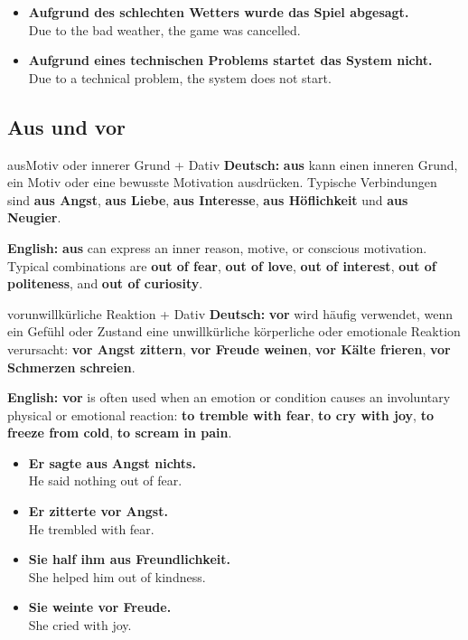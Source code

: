 \documentclass[a4paper,11pt]{article}
\newcommand{\GermanText}[1]{\textbf{Deutsch: }#1\par}
\newcommand{\EnglishText}[1]{{\small\color{SoftGray}\textbf{English: }#1\par}}
\newcommand{\ExampleItem}[2]{\item \textbf{#1}\\{\small\color{SoftGray}#2}}
\begin{document}
            \begin{exbox}
                \begin{itemize}
                    \ExampleItem{Aufgrund des schlechten Wetters wurde das Spiel abgesagt.}{Due to the bad weather, the game was cancelled.}
                    \ExampleItem{Aufgrund eines technischen Problems startet das System nicht.}{Due to a technical problem, the system does not start.}
                \end{itemize}
            \end{exbox}

        \subsection{Aus und vor}

            \begin{grammarentry}{aus}{Motiv oder innerer Grund + Dativ}
                \GermanText{\textbf{aus} kann einen inneren Grund, ein Motiv oder eine bewusste Motivation ausdrücken. Typische Verbindungen sind \textbf{aus Angst}, \textbf{aus Liebe}, \textbf{aus Interesse}, \textbf{aus Höflichkeit} und \textbf{aus Neugier}.}
                \EnglishText{\textbf{aus} can express an inner reason, motive, or conscious motivation. Typical combinations are \textbf{out of fear}, \textbf{out of love}, \textbf{out of interest}, \textbf{out of politeness}, and \textbf{out of curiosity}.}
            \end{grammarentry}

            \begin{grammarentry}{vor}{unwillkürliche Reaktion + Dativ}
                \GermanText{\textbf{vor} wird häufig verwendet, wenn ein Gefühl oder Zustand eine unwillkürliche körperliche oder emotionale Reaktion verursacht: \textbf{vor Angst zittern}, \textbf{vor Freude weinen}, \textbf{vor Kälte frieren}, \textbf{vor Schmerzen schreien}.}
                \EnglishText{\textbf{vor} is often used when an emotion or condition causes an involuntary physical or emotional reaction: \textbf{to tremble with fear}, \textbf{to cry with joy}, \textbf{to freeze from cold}, \textbf{to scream in pain}.}
            \end{grammarentry}

            \begin{exbox}
                \begin{itemize}
                    \ExampleItem{Er sagte aus Angst nichts.}{He said nothing out of fear.}
                    \ExampleItem{Er zitterte vor Angst.}{He trembled with fear.}
                    \ExampleItem{Sie half ihm aus Freundlichkeit.}{She helped him out of kindness.}
                    \ExampleItem{Sie weinte vor Freude.}{She cried with joy.}
                \end{itemize}
            \end{exbox}
\end{document}
